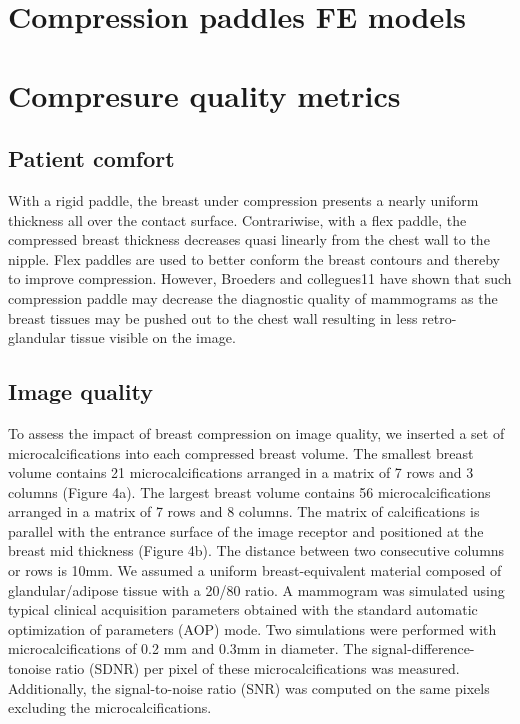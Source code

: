 \section{Compression paddles FE models}
\section{Compresure quality metrics}\label{section:compressionqualitymetrics}
\subsection{Patient comfort}
With a rigid paddle, the breast under compression presents a nearly uniform thickness all over the contact surface. Contrariwise, with a flex paddle, the compressed breast thickness decreases quasi linearly from the chest wall to the nipple. Flex paddles are used to better conform the breast contours and thereby to improve compression. However, Broeders and collegues11 have shown that such compression paddle may decrease the diagnostic quality of mammograms as the breast tissues may be pushed out to the chest wall resulting in less retro-glandular tissue visible on the image. 

\subsection{Image quality }\label{section:averagegalndulardose}
To assess the impact of breast compression on image quality, we inserted a set of microcalcifications into each compressed breast volume. The smallest breast volume contains 21 microcalcifications arranged in a matrix of 7 rows and 3 columns (Figure 4a). The largest breast volume contains 56 microcalcifications arranged in a matrix of 7 rows and 8 columns. The matrix of calcifications is parallel with the entrance surface of the image receptor and positioned at the breast mid thickness (Figure 4b). The distance between two consecutive columns or rows is 10mm. We assumed a uniform breast-equivalent material composed of glandular/adipose tissue with a 20/80 ratio. A mammogram was simulated using typical clinical acquisition parameters obtained with the standard automatic optimization of parameters (AOP) mode. Two simulations were performed with microcalcifications of 0.2 mm and 0.3mm in diameter. The signal-difference-tonoise ratio (SDNR) per pixel of these microcalcifications was measured. Additionally, the signal-to-noise ratio (SNR) was computed on the same pixels excluding the microcalcifications.  


